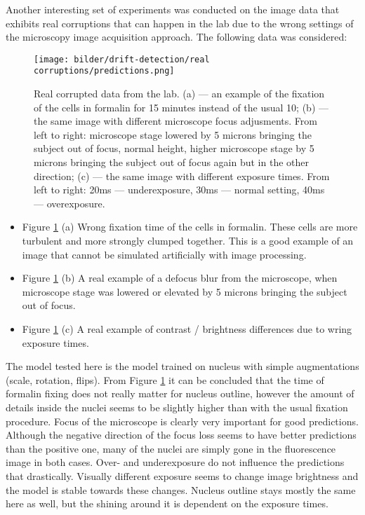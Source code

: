 Another interesting set of experiments was conducted on the image data that exhibits real corruptions that can happen in the lab due to the wrong settings of the microscopy image acquisition approach. The following data was considered: 
\begin{figure}[htb]
	\begin{center}
		\texttt{[image: bilder/drift-detection/real corruptions/predictions.png]}
		\caption[]%
		{Real corrupted data from the lab. (a) --- an example of the fixation of the cells in formalin for 15 minutes instead of the usual 10; (b) --- the same image with different microscope focus adjusments. From left to right: microscope stage lowered by 5 microns bringing the subject out of focus, normal height, higher microscope stage by 5 microns bringing the subject out of focus again but in the other direction; (c) --- the same image with different exposure times. From left to right: 20ms --- underexposure, 30ms --- normal setting, 40ms --- overexposure.}\label{fig:real-corruptions-predictions}
	\end{center}
\end{figure}


\begin{itemize}
    \item Figure \ref{fig:real-corruptions-predictions} (a) Wrong fixation time of the cells in formalin. These cells are more turbulent and more strongly clumped together. This is a good example of an image that cannot be simulated artificially with image processing.
    
    \item Figure \ref{fig:real-corruptions-predictions} (b) A real example of a defocus blur from the microscope, when microscope stage was lowered or elevated by 5 microns bringing the subject out of focus.
    
    \item Figure \ref{fig:real-corruptions-predictions} (c) A real example of contrast / brightness differences due to wring exposure times.
\end{itemize}

The model tested here is the model trained on nucleus with simple augmentations (scale, rotation, flips). From Figure \ref{fig:real-corruptions-predictions} it can be concluded that the time of formalin fixing does not really matter for nucleus outline, however the amount of details inside the nuclei seems to be slightly higher than with the usual fixation procedure. Focus of the microscope is clearly very important for good predictions. Although the negative direction of the focus loss seems to have better predictions than the positive one, many of the nuclei are simply gone in the fluorescence image in both cases. Over- and underexposure do not influence the predictions that drastically. Visually different exposure seems to change image brightness and the model is stable towards these changes. Nucleus outline stays mostly the same here as well, but the shining around it is dependent on the exposure times.